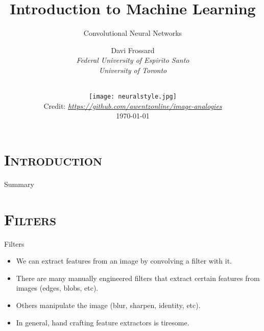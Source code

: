 


\section{\scshape Introduction}
\begin{frame}
	\title{Introduction to Machine Learning}
	\subtitle{Convolutional Neural Networks}
	\author{
		Davi Frossard\\
		{\it Federal University of Espirito Santo \\ University of Toronto}\\
	}
	\date{
		\vspace{-2em}\\
		\texttt{[image: neuralstyle.jpg]}\\[-1ex]
		{\tiny Credit: {\itshape \url{https://github.com/awentzonline/image-analogies}}}
		\\
		\today
	}
	\titlepage
\end{frame}

\begin{frame}{Summary}
	\tableofcontents
\end{frame}

\section{\scshape Filters}
\begin{frame}{Filters}
	\begin{itemize}
		\item We can extract features from an image by convolving a filter with it.
		\item There are many manually engineered filters that extract certain features from images (edges, blobs, etc).
		\item Others manipulate the image (blur, sharpen, identity, etc).
		\item In general, hand crafting feature extractors is tiresome.
	\end{itemize}
\end{frame}

